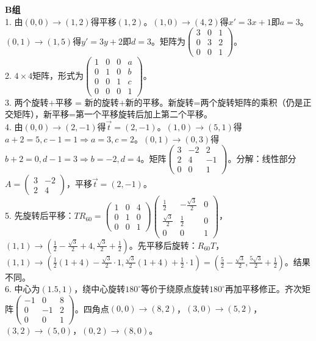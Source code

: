 \noindent\textbf{B组}\\
1. 由$(0,0)\to(1,2)$得平移$(1,2)$。$(1,0)\to(4,2)$得$x'=3x+1$即$a=3$。$(0,1)\to(1,5)$得$y'=3y+2$即$d=3$。矩阵为$\begin{pmatrix}3&0&1\\0&3&2\\0&0&1\end{pmatrix}$。\\
2. $4\times4$矩阵，形式为$\begin{pmatrix}1&0&0&a\\0&1&0&b\\0&0&1&c\\0&0&0&1\end{pmatrix}$。\\
3. 两个旋转+平移 = 新的旋转+新的平移。新旋转=两个旋转矩阵的乘积（仍是正交矩阵），新平移=第一个平移旋转后加上第二个平移。\\
4. 由$(0,0)\to(2,-1)$得$\vec t=(2,-1)$。$(1,0)\to(5,1)$得$a+2=5,c-1=1\Rightarrow a=3,c=2$。$(0,1)\to(0,3)$得$b+2=0,d-1=3\Rightarrow b=-2,d=4$。矩阵$\begin{pmatrix}3&-2&2\\2&4&-1\\0&0&1\end{pmatrix}$。分解：线性部分$A=\begin{pmatrix}3&-2\\2&4\end{pmatrix}$，平移$\vec t=(2,-1)$。\\
5. 先旋转后平移：$T R_{60}=\begin{pmatrix}1&0&4\\0&1&0\\0&0&1\end{pmatrix}\begin{pmatrix}\frac12&-\frac{\sqrt3}{2}&0\\\frac{\sqrt3}{2}&\frac12&0\\0&0&1\end{pmatrix}$，$(1,1)\to(\frac12-\frac{\sqrt3}{2}+4,\frac{\sqrt3}{2}+\frac12)$。先平移后旋转：$R_{60}T$，$(1,1)\to(\frac12(1+4)-\frac{\sqrt3}{2}\cdot1,\frac{\sqrt3}{2}(1+4)+\frac12\cdot1)=(\frac52-\frac{\sqrt3}{2},\frac{5\sqrt3}{2}+\frac12)$。结果不同。\\
6. 中心为$(1.5,1)$，绕中心旋转$180^\circ$等价于绕原点旋转$180^\circ$再加平移修正。齐次矩阵$\begin{pmatrix}-1&0&8\\0&-1&2\\0&0&1\end{pmatrix}$。四角点$(0,0)\to(8,2)$，$(3,0)\to(5,2)$，$(3,2)\to(5,0)$，$(0,2)\to(8,0)$。

